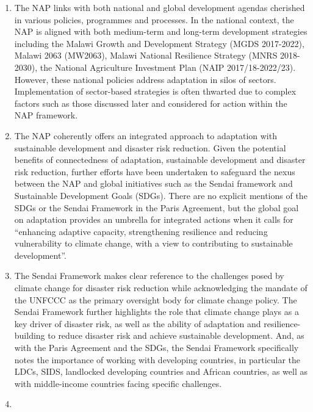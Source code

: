 \documentclass[
]{book}
\begin{document}
\begin{enumerate}
\def\labelenumi{\arabic{enumi}.}
\setcounter{enumi}{4}
\item
  The NAP links with both national and global development agendas cherished in various policies, programmes and processes. In the national context, the NAP is aligned with both medium-term and long-term development strategies including the Malawi Growth and Development Strategy (MGDS 2017-2022), Malawi 2063 (MW2063), Malawi National Resilience Strategy (MNRS 2018- 2030), the National Agriculture Investment Plan (NAIP 2017/18-2022/23). However, these national policies address adaptation in silos of sectors. Implementation of sector-based strategies is often thwarted due to complex factors such as those discussed later and considered for action within the NAP framework.
\item
  The NAP coherently offers an integrated approach to adaptation with sustainable development and disaster risk reduction. Given the potential benefits of connectedness of adaptation, sustainable development and disaster risk reduction, further efforts have been undertaken to safeguard the nexus between the NAP and global initiatives such as the Sendai framework and Sustainable Development Goals (SDGs). There are no explicit mentions of the SDGs or the Sendai Framework in the Paris Agreement, but the global goal on adaptation provides an umbrella for integrated actions when it calls for ``enhancing adaptive capacity, strengthening resilience and reducing vulnerability to climate change, with a view to contributing to sustainable development''.
\item
  The Sendai Framework makes clear reference to the challenges posed by climate change for disaster risk reduction while acknowledging the mandate of the UNFCCC as the primary oversight body for climate change policy. The Sendai Framework further highlights the role that climate change plays as a key driver of disaster risk, as well as the ability of adaptation and resilience-building to reduce disaster risk and achieve sustainable development. And, as with the Paris Agreement and the SDGs, the Sendai Framework specifically notes the importance of working with developing countries, in particular the LDCs, SIDS, landlocked developing countries and African countries, as well as with middle-income countries facing specific challenges.
\item

\end{enumerate}
\end{document}
